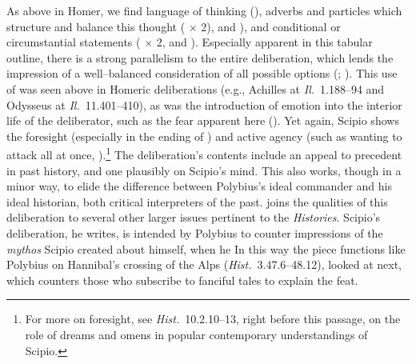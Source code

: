 \documentclass[12pt,letterpaper,oneside,final]{memoir}
\begin{document}
As above in Homer, we find language of thinking (), adverbs and particles which structure and balance this thought (    $\times$ 2),    and ), and conditional or circumstantial statements ( $\times$ 2,  and ). Especially apparent in this tabular outline, there is a strong parallelism to the entire deliberation, which lends the impression of a well--balanced consideration of all possible options (; ). This use of  was seen above in Homeric deliberations (e.g., Achilles at \emph{Il.}~1.188–94 and Odysseus at \emph{Il.}~11.401–410), as was the introduction of emotion into the interior life of the deliberator, such as the fear apparent here (). Yet again, Scipio shows the foresight (especially in the ending of ) and active agency (such as wanting to attack all at once, ).\footnote{For more on foresight, see \emph{Hist.}~10.2.10--13, right before this passage, on the role of dreams and omens in popular contemporary understandings of Scipio.} The deliberation's contents include an appeal to precedent in past history, and one plausibly on Scipio's mind. This also works, though in a minor way, to elide the difference between Polybius's ideal commander and his ideal historian, both critical interpreters of the past. \textcite{walbank1967} joins the qualities of this deliberation to several other larger issues pertinent to the \emph{Histories}. Scipio's deliberation, he writes, is intended by Polybius to counter impressions of the \emph{mythos} Scipio created about himself, when he  In this way the piece functions like Polybius on Hannibal's crossing of the Alps (\emph{Hist.}~3.47.6--48.12), looked at next, which counters those who subscribe to fanciful tales to explain the feat.
\end{document}
